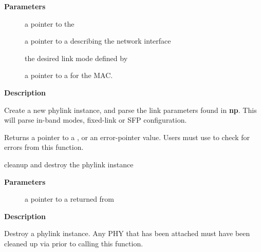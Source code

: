 \documentclass[a4paper,8pt,english]{sphinxmanual}
\begin{document}
\textbf{Parameters}
\begin{description}
\item[{}] \leavevmode
a pointer to the {\hyperref[networking/kapi:c.net_device]{\emph{}}}

\item[{}] \leavevmode
a pointer to a  describing the network
interface

\item[{}] \leavevmode
the desired link mode defined by 

\item[{}] \leavevmode
a pointer to a {\hyperref[networking/kapi:c.phylink_mac_ops]{\emph{}}} for the MAC.

\end{description}

\textbf{Description}

Create a new phylink instance, and parse the link parameters found in \textbf{np}.
This will parse in-band modes, fixed-link or SFP configuration.

Returns a pointer to a {\hyperref[networking/kapi:c.phylink]{\emph{}}}, or an error-pointer value. Users
must use  to check for errors from this function.

\begin{fulllineitems}
\label{networking/kapi:c.phylink_destroy}
cleanup and destroy the phylink instance

\end{fulllineitems}


\textbf{Parameters}
\begin{description}
\item[{}] \leavevmode
a pointer to a {\hyperref[networking/kapi:c.phylink]{\emph{}}} returned from {\hyperref[networking/kapi:c.phylink_create]{\emph{}}}

\end{description}

\textbf{Description}

Destroy a phylink instance. Any PHY that has been attached must have been
cleaned up via {\hyperref[networking/kapi:c.phylink_disconnect_phy]{\emph{}}} prior to calling this function.
\end{document}
